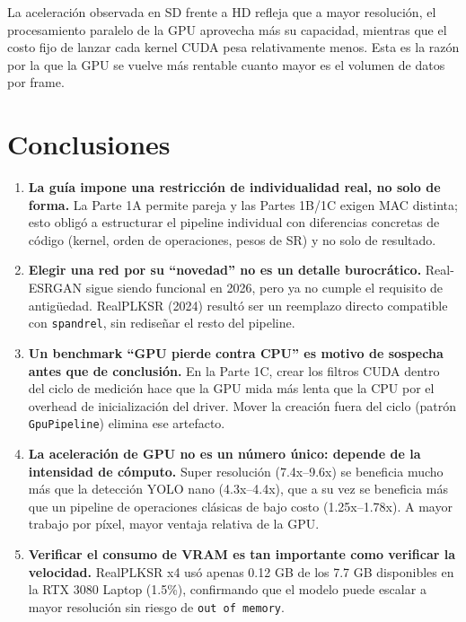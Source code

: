 \documentclass[12pt,a4paper]{article}
\begin{document}
La aceleración observada en SD frente a HD refleja que a mayor resolución, el procesamiento paralelo de la GPU aprovecha más su capacidad, mientras que el costo fijo de lanzar cada kernel CUDA pesa relativamente menos. Esta es la razón por la que la GPU se vuelve más rentable cuanto mayor es el volumen de datos por frame.

\section{Conclusiones}

\begin{enumerate}

\item \textbf{La guía impone una restricción de individualidad real, no solo de forma.} La Parte 1A permite pareja y las Partes 1B/1C exigen MAC distinta; esto obligó a estructurar el pipeline individual con diferencias concretas de código (kernel, orden de operaciones, pesos de SR) y no solo de resultado.

\item \textbf{Elegir una red por su ``novedad'' no es un detalle burocrático.} Real-ESRGAN sigue siendo funcional en 2026, pero ya no cumple el requisito de antigüedad. RealPLKSR (2024) resultó ser un reemplazo directo compatible con \texttt{spandrel}, sin rediseñar el resto del pipeline.

\item \textbf{Un benchmark ``GPU pierde contra CPU'' es motivo de sospecha antes que de conclusión.} En la Parte 1C, crear los filtros CUDA dentro del ciclo de medición hace que la GPU mida más lenta que la CPU por el overhead de inicialización del driver. Mover la creación fuera del ciclo (patrón \texttt{GpuPipeline}) elimina ese artefacto.

\item \textbf{La aceleración de GPU no es un número único: depende de la intensidad de cómputo.} Super resolución (7.4x--9.6x) se beneficia mucho más que la detección YOLO nano (4.3x--4.4x), que a su vez se beneficia más que un pipeline de operaciones clásicas de bajo costo (1.25x--1.78x). A mayor trabajo por píxel, mayor ventaja relativa de la GPU.

\item \textbf{Verificar el consumo de VRAM es tan importante como verificar la velocidad.} RealPLKSR x4 usó apenas 0.12 GB de los 7.7 GB disponibles en la RTX 3080 Laptop (1.5\%), confirmando que el modelo puede escalar a mayor resolución sin riesgo de \texttt{out of memory}.

\end{enumerate}
\end{document}
